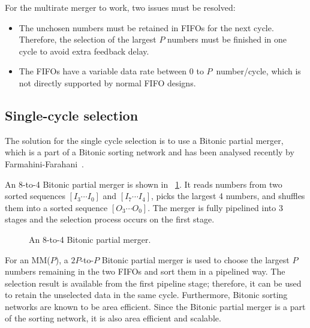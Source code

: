 \documentclass[10pt, conference]{IEEEtran}
\begin{document}
For the multirate merger to work, two issues must be resolved:

\begin{itemize}
\item The unchosen numbers must be retained in FIFOs for the next cycle.
Therefore, the selection of the largest $P$ numbers must be finished in one cycle to avoid extra feedback delay.
\item The FIFOs have a variable data rate between 0 to $P$~number/cycle,
which is not directly supported by normal FIFO designs.
\end{itemize}

\subsection{Single-cycle selection}

The solution for the single cycle selection is to use a Bitonic partial merger,
which is a part of a Bitonic sorting network and has been analysed recently by Farmahini-Farahani~\cite{Farmahini-Farahani2013}.

An 8-to-4 Bitonic partial merger is shown in \figurename~\ref{fig_bpmerger}.
It reads numbers from two sorted sequences $[I_3 \cdots I_0]$ and $[I_7 \cdots I_4]$,
picks the largest 4 numbers, and shuffles them into a sorted sequence $[O_3 \cdots O_0]$.
The merger is fully pipelined into 3 stages and the selection process occurs on the first stage.

\begin{figure}[bt]
\caption{An 8-to-4 Bitonic partial merger.}\label{fig_bpmerger}
\end{figure}

For an MM($P$), a $2P$-to-$P$ Bitonic partial merger is used to choose the largest $P$ numbers
remaining in the two FIFOs and sort them in a pipelined way.
The selection result is available from the first pipeline stage;
therefore, it can be used to retain the unselected data in the same cycle.
Furthermore, Bitonic sorting networks are known to be area efficient.
Since the Bitonic partial merger is a part of the sorting network, it is also area efficient and scalable.
\end{document}
